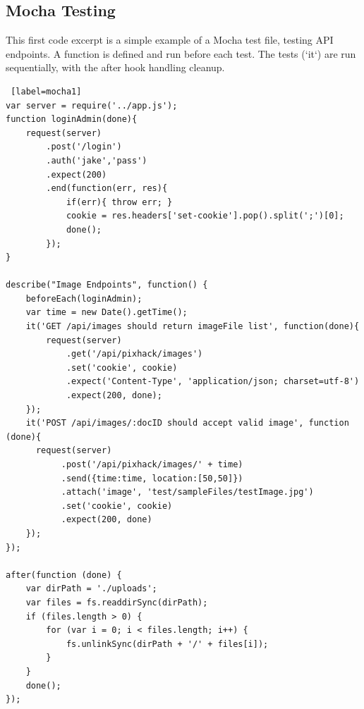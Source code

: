 \documentclass{article}
\begin{document}
\subsection{Mocha Testing}
This first code excerpt is a simple example of a Mocha test file, testing API endpoints. A function is defined and run before each test. The tests (`it`) are run sequentially, with the after hook handling cleanup.
\begin{lstlisting} [label=mocha1]
var server = require('../app.js');
function loginAdmin(done){
	request(server)
		.post('/login')
		.auth('jake','pass')
		.expect(200)
		.end(function(err, res){
			if(err){ throw err; }
			cookie = res.headers['set-cookie'].pop().split(';')[0];
			done();
		});
}

describe("Image Endpoints", function() {
	beforeEach(loginAdmin); 	
	var time = new Date().getTime();
	it('GET /api/images should return imageFile list', function(done){
		request(server)
			.get('/api/pixhack/images')
			.set('cookie', cookie)
			.expect('Content-Type', 'application/json; charset=utf-8')
			.expect(200, done);
	});
	it('POST /api/images/:docID should accept valid image', function (done){
	  request(server)
		   .post('/api/pixhack/images/' + time)
		   .send({time:time, location:[50,50]})
		   .attach('image', 'test/sampleFiles/testImage.jpg')
		   .set('cookie', cookie)
		   .expect(200, done)
	});
});

after(function (done) {
	var dirPath = './uploads';
	var files = fs.readdirSync(dirPath);
	if (files.length > 0) {
		for (var i = 0; i < files.length; i++) {
			fs.unlinkSync(dirPath + '/' + files[i]);
		}
	}
	done();
});
\end{lstlisting}
\end{document}
